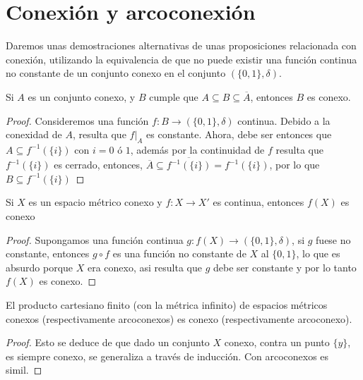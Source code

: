 \documentclass[12pt,a4paper]{book}
\begin{document}
\section{Conexión y arcoconexión}
Daremos unas demostraciones alternativas de unas proposiciones relacionada con conexión, utilizando la equivalencia de que no puede existir una función continua no constante de un conjunto conexo en el conjunto $(\{0,1\},\delta)$.
\begin{prop}
Si $A$ es un conjunto conexo, y $B$ cumple que $A \subseteq B \subseteq \overline{A}$, entonces $B$ es conexo.
\begin{proof}
Consideremos una función $f: B \rightarrow (\{0,1\},\delta)$ continua. Debido a la conexidad de $A$, resulta que $f \vert_A$ es constante.
Ahora, debe ser entonces que $A \subseteq f^{-1}(\{i\})$ con $i = 0$ ó $1$, además por la continuidad de $f$ resulta que $f^{-1}(\{i\})$ es cerrado,
entonces, $\overline{A} \subseteq \overline{f^{-1}(\{i\})} = f^{-1}(\{i\})$, por lo que $B \subseteq f^{-1}(\{i\})$
\end{proof}
\end{prop}
\begin{prop}
Si $X$ es un espacio métrico conexo y $f : X \rightarrow X'$ es continua, entonces $f(X)$ es conexo
\begin{proof}
Supongamos una función continua $g : f(X) \rightarrow (\{0,1\},\delta)$, si $g$ fuese no constante, entonces $ g \circ f$ es una función no constante de $X$ al $\{0,1\}$, lo que es absurdo porque $X$ era conexo, asi resulta que $g$ debe ser constante y por lo tanto $f(X)$ es conexo.
\end{proof}
\end{prop}
\begin{prop}
El producto cartesiano finito (con la métrica infinito) de espacios métricos conexos (respectivamente arcoconexos) es conexo (respectivamente arcoconexo).
\begin{proof}
Esto se deduce de que dado un conjunto $X$ conexo, contra un punto $\{y\}$, es siempre conexo, se generaliza a través de inducción. Con arcoconexos es simil.
\end{proof}
\end{prop}
\end{document}
